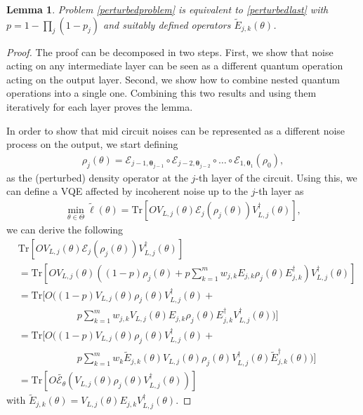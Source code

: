 \documentclass[10pt,a4paper]{amsart}
\newtheorem{lemma}{Lemma}
\newcommand{\Tr}{\mathrm{Tr}}
\begin{document}
\begin{lemma}
   Problem \eqref{perturbedproblem} is equivalent to \eqref{perturbedlast} with 
   $p=1-\prod_j (1-p_j)$ and suitably defined operators $\tilde{E}_{j,k}(\theta)$. 
\end{lemma}

\begin{proof}
The proof can be decomposed in two steps.
First, we show that noise acting on any intermediate layer can be seen as a different quantum operation acting on the 
output layer.
Second, we show how to combine nested quantum operations into a single one. 
Combining this two results and using them iteratively for each layer proves the lemma. 

In order to show that mid circuit noises can be represented as a different noise process on the output,
we start defining 
\begin{align}
   \rho_j(\theta)=\mathcal{E}_{j-1,\mathbf{\theta}_{j-1}} \circ \mathcal{E}_{j-2,\mathbf{\theta}_{j-2}} \circ \dots \circ \mathcal{E}_{1,\mathbf{\theta}_1} (\rho_0), 
\end{align}
as the (perturbed) density operator at the $j$-th layer of the circuit. 
Using this, we can define a VQE affected by incoherent noise up to the $j$-th layer as 
\begin{align}
    \min_{\theta \in \Theta} \tilde{\ell} (\theta) = \Tr[O V_{L,j}(\theta) \mathcal{E}_j(\rho_j(\theta))V_{L,j}^\dagger (\theta)],
\end{align}
we can derive the following
\begin{align}
    & \Tr[O V_{L,j}(\theta) \mathcal{E}_j(\rho_j(\theta))V_{L,j}^\dagger (\theta)] \nonumber \\
    & = \Tr[O V_{L,j}(\theta) ((1-p)\rho_j(\theta) + \nonumber p \sum_{k=1}^{m} w_{j,k} E_{j,k} \rho_j(\theta) E^\dagger_{j,k}) V_{L,j}^\dagger (\theta)] \nonumber \\
    & = \Tr[O ((1-p)V_{L,j}(\theta)\rho_j(\theta) V_{L,j}^\dagger (\theta) +  \nonumber \\
    & \quad \quad \quad \quad \quad \quad p \sum_{k=1}^{m} w_{j,k} V_{L,j}(\theta)E_{j,k} \rho_j(\theta) E^\dagger_{j,k}V_{L,j}^\dagger (\theta))]  \nonumber \\
    & = \Tr[O ((1-p)V_{L,j}(\theta)\rho_j(\theta) V_{L,j}^\dagger (\theta) + \nonumber \\
    & \quad \quad \quad \quad \quad \quad p \sum_{k=1}^{m} w_k \tilde{E}_{j,k}(\theta)V_{L,j}(\theta)\rho_j(\theta) V_{L,j}^\dagger (\theta)\tilde{E}^\dagger_{j,k}(\theta))] \nonumber \\
    & = \Tr[O \tilde{\mathcal{E}_\theta}(V_{L,j}(\theta) \rho_j(\theta) V_{L,j}^\dagger (\theta))]    
\end{align}
with $\tilde{E}_{j,k}(\theta) = V_{L,j}(\theta)E_{j,k} V_{L,j}^\dagger (\theta)$. 


\end{proof}
\end{document}
